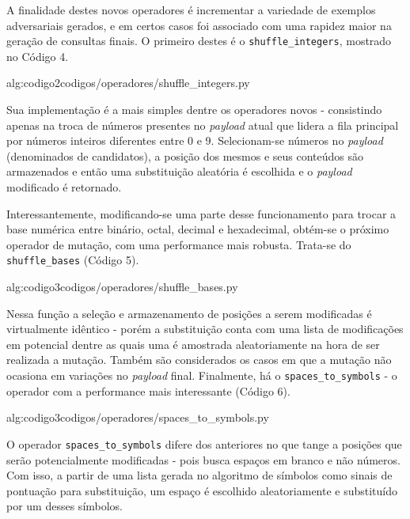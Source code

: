A finalidade destes novos operadores é incrementar a variedade de exemplos adversariais gerados, e em certos casos foi associado com uma rapidez maior na geração de consultas finais. O primeiro destes é o \verb+shuffle_integers+, mostrado no Código 4.

\label{sec:codigos}
 {alg:codigo2}{codigos/operadores/shuffle_integers.py}

\bigskip

Sua implementação é a mais simples dentre os operadores novos - consistindo apenas na troca de números presentes no \textit{payload} atual que lidera a fila principal por números inteiros diferentes entre 0 e 9. Selecionam-se números no \textit{payload} (denominados de candidatos), a posição dos mesmos e seus conteúdos são armazenados e então uma substituição aleatória é escolhida e o \textit{payload} modificado é retornado.  

Interessantemente, modificando-se uma parte desse funcionamento para trocar a base numérica entre binário, octal, decimal e hexadecimal, obtém-se o próximo operador de mutação, com uma performance mais robusta. Trata-se do \verb+shuffle_bases+ (Código 5).

\label{sec:codigos}
 {alg:codigo3}{codigos/operadores/shuffle_bases.py}

\bigskip

Nessa função a seleção e armazenamento de posições a serem modificadas é virtualmente idêntico - porém a substituição conta com uma lista de modificações em potencial dentre as quais uma é amostrada aleatoriamente na hora de ser realizada a mutação. Também são considerados os casos em que a mutação não ocasiona em variações no \textit{payload} final. Finalmente, há o \verb+spaces_to_symbols+ - o operador com a performance mais interessante (Código 6).

\label{sec:codigos}
 {alg:codigo3}{codigos/operadores/spaces_to_symbols.py}

\bigskip

O operador \verb+spaces_to_symbols+ difere dos anteriores no que tange a posições que serão potencialmente modificadas - pois busca espaços em branco e não números. Com isso, a partir de uma lista gerada no algoritmo de símbolos como sinais de pontuação para substituição, um espaço é escolhido aleatoriamente e substituído por um desses símbolos.

